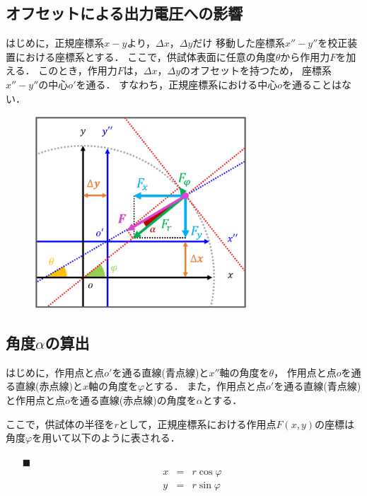 \documentclass[twocolumn,a4j]{jsarticle}
\begin{document}
\newpage

\subsection{オフセットによる出力電圧への影響}

はじめに，正規座標系$x-y$より，$\Delta x$，$\Delta y$だけ
移動した座標系$x''-y''$を校正装置における座標系とする．
ここで，供試体表面に任意の角度$\theta$から作用力$F$を加える．
このとき，作用力$F$は，$\Delta x$，$\Delta y$のオフセットを持つため，
座標系$x''-y''$の中心$o'$を通る．
すなわち，正規座標系における中心$o$を通ることはない．

\begin{figure}[htbp]
    \footnotesize
    \begin{center}
        \includegraphics[width=80mm]{../images/image_6.png}
        \caption{}
    \end{center}
\end{figure}

\subsection{角度$\alpha$の算出}
はじめに，作用点と点$o'$を通る直線(青点線)と$x''$軸の角度を$\theta$，
作用点と点$o$を通る直線(赤点線)と$x$軸の角度を$\varphi$とする．
また，作用点と点$o'$を通る直線(青点線)と作用点と点$o$を通る直線(赤点線)の角度を$\alpha$とする．

ここで，供試体の半径を$r$として，正規座標系における作用点$F\left(x,y\right)$の座標は
角度$\varphi$を用いて以下のように表される．

\begin{itemize}
    \item [$\blacksquare$] 
          \begin{eqnarray*}
              x &=& r \cos \varphi\\
              y &=& r \sin \varphi\\
          \end{eqnarray*}
\end{itemize}
\end{document}
